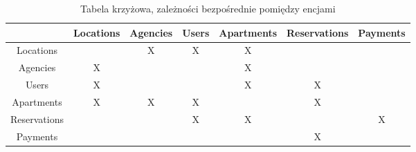 \documentclass[polish, 11pt]{article}
\begin{document}
            \begin{table}[h]
                \centering
                \caption{Tabela krzyżowa, zależności bezpośrednie pomiędzy encjami}\label{tab:cross}
                \begin{tabular}{ccccccc}\toprule
                    &	Locations	&	Agencies	&	Users	&	Apartments	&	Reservations	&	Payments	\\\midrule
                    Locations	    &		&	X	&	X	&	X	&		&		\\
                    Agencies	    &	X	&		&		&	X	&		&		\\
                    Users	        &	X	&		&		&	X	&	X	&		\\
                    Apartments	    &	X	&	X	&	X	&		&	X	&		\\
                    Reservations	&		&		&	X	&	X	&		&	X	\\
                    Payments	    &		&		&		&		&	X	&		\\
                \bottomrule
                \end{tabular}
            \end{table}
\end{document}
